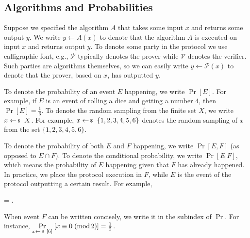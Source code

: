\documentclass[../lecture-notes-148x210.tex]{subfiles}
\begin{document}
\subsection*{Algorithms and Probabilities}

Suppose we specified the algorithm $A$ that takes some input $x$ and returns
some output $y$. We write $y \gets A(x)$ to denote that the algorithm $A$ is
executed on input $x$ and returns output $y$. To denote some party in the 
protocol we use calligraphic font, e.g., $\mathcal{P}$ typically denotes 
the prover while $\mathcal{V}$ denotes the verifier. Such parties are algorithms 
themselves, so we can easily write $y \gets \mathcal{P}(x)$ to denote that 
the prover, based on $x$, has outputted $y$.

To denote the probability of an event $E$ happening, we write $\Pr[E]$. For
example, if $E$ is an event of rolling a dice and getting a number $4$, then
$\Pr[E] = \frac{1}{6}$. To denote the random sampling from the finite set $X$,
we write $x \leftarrowS X$. For example, $x \leftarrowS \{1,2,3,4,5,6\}$
denotes the random sampling of $x$ from the set $\{1,2,3,4,5,6\}$.

To denote the probability of both $E$ and $F$ happening, we write $\Pr[E,F]$ (as
opposed to $E \cap F$). To denote the conditional probability, we write
$\Pr[E|F]$, which means the probability of $E$ happening given that $F$ has
already happened. In practice, we place the protocol execution in $F$, while $E$
is the event of the protocol outputting a certain result. For example,
\begin{xequation}
    \Pr{} = .
\end{xequation}

When event $F$ can be written concisely, we write it in the subindex of $\Pr$.
For instance, $\underset{x \leftarrowS [6]}{\Pr}[x \equiv 0 \; (\text{mod}\,2)]=\frac{1}{2}$.
\end{document}

